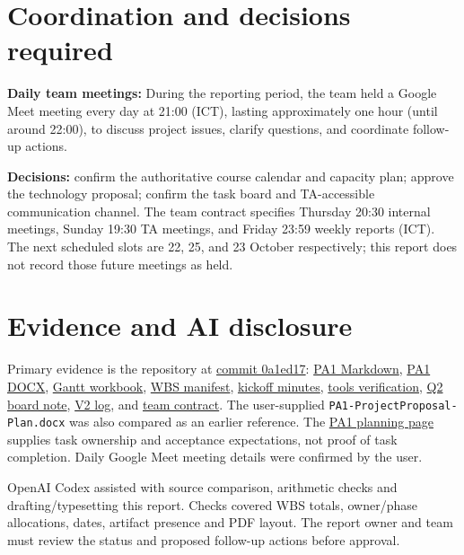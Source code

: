 \documentclass[11pt,a4paper]{article}
\newcommand{\src}[2]{\href{https://github.com/Vincenthevinh/UniLib/blob/0a1ed17/#1}{#2}}
\begin{document}
\section{Coordination and decisions required}
\textbf{Daily team meetings:} During the reporting period, the team held a Google Meet meeting every day at 21:00 (ICT), lasting approximately one hour (until around 22:00), to discuss project issues, clarify questions, and coordinate follow-up actions.

\textbf{Decisions:} confirm the authoritative course calendar and capacity plan; approve the technology proposal; confirm the task board and TA-accessible communication channel. The team contract specifies Thursday 20:30 internal meetings, Sunday 19:30 TA meetings, and Friday 23:59 weekly reports (ICT). The next scheduled slots are 22, 25, and 23 October respectively; this report does not record those future meetings as held.

\section{Evidence and AI disclosure}
{\footnotesize
Primary evidence is the repository at \href{https://github.com/Vincenthevinh/UniLib/tree/0a1ed17}{commit 0a1ed17}: \src{pa/PA1/PA1-ProjectProposal-Plan.md}{PA1 Markdown}, \src{pa/PA1/PA1-ProjectProposal-Plan.docx}{PA1 DOCX}, \src{pa/PA1/Gantt_Chart.xlsx}{Gantt workbook}, \src{docs/management/pa1-wbs-board.json}{WBS manifest}, \src{docs/management/kickoff-meeting-minutes.md}{kickoff minutes}, \src{docs/management/pa1-tools-setup.md}{tools verification}, \src{docs/management/pa1-q2-board-setup.md}{Q2 board note}, \src{docs/ai-usage/pa1-v2-estimation-and-schedule.md}{V2 log}, and \src{pa/PA0-ProjectIdea-TeamContract.md}{team contract}. The user-supplied \texttt{PA1-ProjectProposal-Plan.docx} was also compared as an earlier reference. The \href{https://unilib-project-plan.netlify.app/}{PA1 planning page} supplies task ownership and acceptance expectations, not proof of task completion. Daily Google Meet meeting details were confirmed by the user.

OpenAI Codex assisted with source comparison, arithmetic checks and drafting/typesetting this report. Checks covered WBS totals, owner/phase allocations, dates, artifact presence and PDF layout. The report owner and team must review the status and proposed follow-up actions before approval.}
\end{document}
